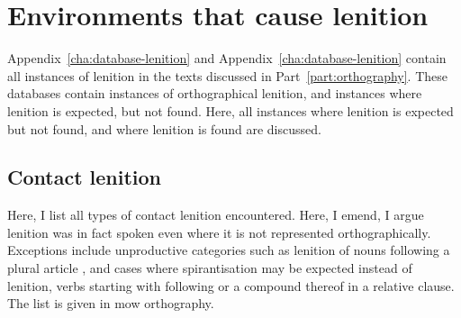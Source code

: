 \chapter{Environments that cause lenition}
\label{cha:envir-that-cause}

Appendix~\ref{cha:database-lenition} and Appendix~\ref{cha:database-lenition} contain all instances of lenition in the texts discussed in Part~\ref{part:orthography}. These databases contain instances of orthographical lenition, and instances where  lenition is expected, but not found. Here, all instances where lenition is expected but not found, and where lenition is found are discussed.

\section{Contact lenition}
\label{sec:contact-lenition-1}
Here, I list all types of contact lenition encountered. Here, I emend, \ie I argue lenition was in fact spoken even where it is not represented orthographically. Exceptions include unproductive categories such as lenition of nouns following a plural article \eg {}, and cases where spirantisation may be expected instead of lenition, \eg verbs starting with  following  or a compound thereof in a relative clause. The list is given in \gls{mow} orthography. 

